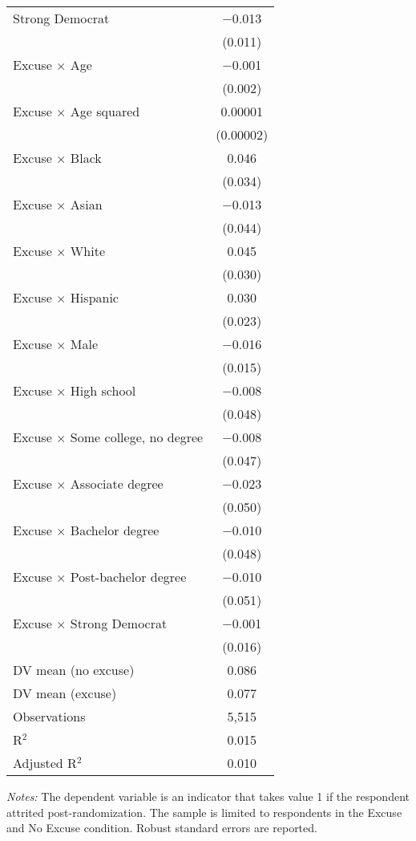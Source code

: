 \begin{center}
\begin{ThreePartTable}
\begin{longtable}{lc}
 \addlinespace 
 Strong Democrat & $-$0.013 \\ 
  & (0.011) \\ 
 \addlinespace 
 Excuse $\times$ Age & $-$0.001 \\ 
  & (0.002) \\ 
 \addlinespace 
 Excuse $\times$ Age squared & 0.00001 \\ 
  & (0.00002) \\ 
 \addlinespace 
 Excuse $\times$ Black & 0.046 \\ 
  & (0.034) \\ 
 \addlinespace 
 Excuse $\times$ Asian & $-$0.013 \\ 
  & (0.044) \\ 
 \addlinespace 
 Excuse $\times$ White & 0.045 \\ 
  & (0.030) \\ 
 \addlinespace 
 Excuse $\times$ Hispanic & 0.030 \\ 
  & (0.023) \\ 
 \addlinespace 
 Excuse $\times$ Male & $-$0.016 \\ 
  & (0.015) \\ 
 \addlinespace 
 Excuse $\times$ High school & $-$0.008 \\ 
  & (0.048) \\ 
 \addlinespace 
 Excuse $\times$ Some college, no degree & $-$0.008 \\ 
  & (0.047) \\ 
 \addlinespace 
 Excuse $\times$ Associate degree & $-$0.023 \\ 
  & (0.050) \\ 
 \addlinespace 
 Excuse $\times$ Bachelor degree & $-$0.010 \\ 
  & (0.048) \\ 
 \addlinespace 
 Excuse $\times$ Post-bachelor degree & $-$0.010 \\ 
  & (0.051) \\ 
 \addlinespace 
 Excuse $\times$ Strong Democrat & $-$0.001 \\ 
  & (0.016) \\ 
 \addlinespace 
\midrule  
DV mean (no excuse) & 0.086 \\
DV mean (excuse) & 0.077 \\
Observations & 5,515 \\ 
R$^{2}$ & 0.015 \\ 
Adjusted R$^{2}$ & 0.010 \\ 
\bottomrule 
\end{longtable}
\end{ThreePartTable}
\end{center}
\footnotesize
\insertTableNotes
\textit{Notes: }The dependent variable is an indicator that takes value 1 if the respondent attrited post-randomization. The sample is limited to respondents in the Excuse and No Excuse condition. Robust standard errors are reported.
